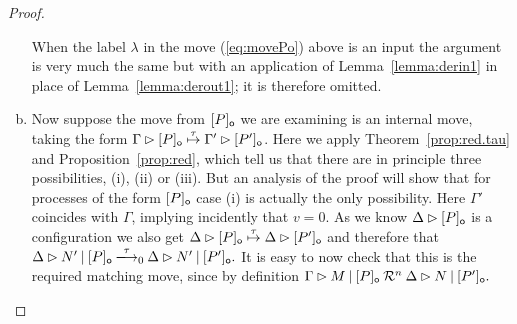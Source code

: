 \documentclass{LMCS}
\newcommand{\with}{\mathbin \rhd}
\newcommand{\calR}{\mathbin{\mathcal{R}}}
\newcommand{\Cpar}{\mathbin{|}}
\newcommand{\Cloc}[2]{[#1]_{\ownfnt{#2}}}
\newcommand{\ar}[1]{\mathbin{\xlongrightarrow{ #1}}}
\begin{document}
\begin{proof}
\begin{enumerate}[(a)]
When the label $\lambda$ in the move (\ref{eq:movePo}) above is an input the argument is very  much the same but
with an application of 
Lemma~\ref{lemma:derin1} in place of Lemma~\ref{lemma:derout1}; it is therefore omitted. 

\item



Now suppose the move from $\Cloc{P}{o}$ we are examining is an internal move, taking the form
$\Gamma \with \Cloc{P}{o}  \newar{\tau} \Gamma' \with  \Cloc{P'}{o}$. Here we apply Theorem~\ref{prop:red.tau} and 
Proposition~\ref{prop:red}, which tell us that there are in principle three 
possibilities, (i), (ii)  or (iii). But an analysis of the proof will show that for processes of the form
$\Cloc{P}{o}$ case (i) is actually the only possibility. 
Here  $\Gamma'$ coincides with $\Gamma$, implying  incidently that
$v=0$. As we know $\Delta \with \Cloc{P}{o}$ is a configuration we also get
\begin{math}
  \Delta \with \Cloc{P}{o} \newar{\tau} \Delta \with \Cloc{P'}{o}
\end{math}
and therefore that 
\begin{math}
  \Delta \with N' \Cpar \Cloc{P}{o} \ar{\tau}_0 \Delta \with N' \Cpar \Cloc{P'}{o}.
\end{math}
It is easy to now check that this is the required matching move, since by definition
\begin{math}
  \Gamma \with M \Cpar \Cloc{P}{o} \calR^n  \Delta \with N \Cpar \Cloc{P'}{o}.
\end{math}

\end{enumerate}


\end{proof}
\end{document}
